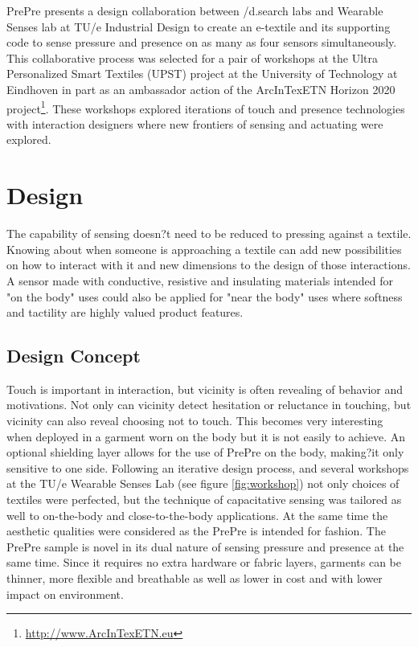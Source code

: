\documentclass{sigchi-ext}
\begin{document}
PrePre presents a design collaboration between /d.search labs and Wearable Senses lab at TU/e Industrial Design to create an e-textile and its supporting code to sense pressure and presence on as many as four sensors simultaneously. This collaborative process was selected for a pair of workshops at the Ultra Personalized Smart Textiles (UPST) project at the University of Technology at Eindhoven in part as an ambassador action of the ArcInTexETN Horizon 2020 project\footnote{\url{http://www.ArcInTexETN.eu}}. These workshops explored iterations of touch and presence technologies with interaction designers where new frontiers of sensing and actuating were explored.  

\section{Design}
The capability of sensing doesn?t need to be reduced to pressing against a textile. Knowing about when someone is approaching a textile can add new possibilities on how to interact with it and new dimensions to the design of those interactions. A sensor made with conductive, resistive and insulating materials  intended for "on the body" uses could also be applied for "near the body" uses where softness and tactility are highly valued product features.
\subsection{Design Concept}
Touch is important in interaction, but vicinity is often revealing of behavior and motivations. Not only can vicinity detect hesitation or reluctance in touching, but vicinity can also reveal choosing not to touch. This becomes very interesting when deployed in a garment worn on the body but it is not easily to achieve. An optional shielding layer allows for the use of PrePre on the body, making?it only sensitive to one side. Following an iterative design process, and several workshops at the TU/e Wearable Senses Lab (see figure  \ref{fig:workshop}) not only choices of textiles were perfected, but the technique of capacitative sensing was tailored as well to on-the-body and close-to-the-body applications. At the same time the aesthetic qualities were considered as the PrePre is intended for fashion. The PrePre sample is novel in its dual nature of sensing pressure and presence at the same time. Since it requires no extra hardware or fabric layers, garments can be thinner, more flexible and breathable as well as lower in cost and with lower impact on environment. 
\end{document}
